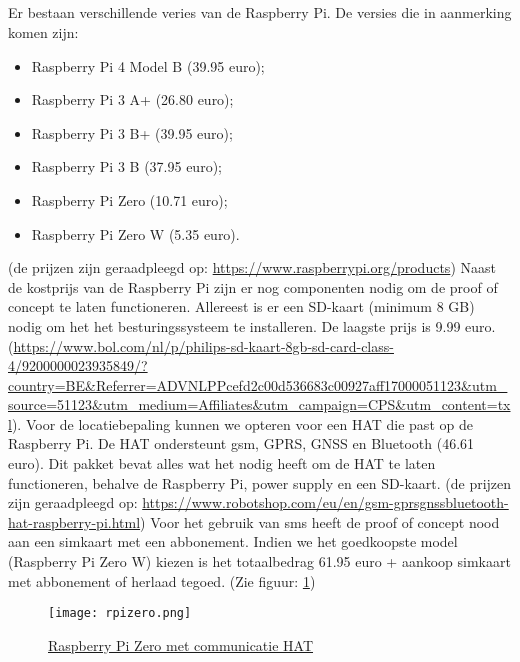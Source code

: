 \subsection{}
Er bestaan verschillende veries van de Raspberry Pi. De versies die in aanmerking komen zijn:
\begin{itemize}
    \item Raspberry Pi 4 Model B (39.95 euro);
    \item Raspberry Pi 3 A+ (26.80 euro);
    \item Raspberry Pi 3 B+ (39.95 euro);
    \item Raspberry Pi 3 B (37.95 euro);
    \item Raspberry Pi Zero (10.71 euro);
    \item Raspberry Pi Zero W (5.35 euro).
\end{itemize}
(de prijzen zijn geraadpleegd op: \url{https://www.raspberrypi.org/products})
\newline
Naast de kostprijs van de Raspberry Pi zijn er nog componenten nodig om de proof of concept te laten functioneren. 
Allereest is er een SD-kaart (minimum 8 GB) nodig om het het besturingssysteem te installeren. De laagste prijs is 9.99 euro. (\url{https://www.bol.com/nl/p/philips-sd-kaart-8gb-sd-card-class-4/9200000023935849/?country=BE&Referrer=ADVNLPPcefd2c00d536683c00927aff17000051123&utm_source=51123&utm_medium=Affiliates&utm_campaign=CPS&utm_content=txl}).
\newline
Voor de locatiebepaling kunnen we opteren voor een HAT die past op de Raspberry Pi. De HAT ondersteunt gsm, GPRS, GNSS en Bluetooth (46.61 euro). Dit pakket bevat alles wat het nodig heeft om de HAT te laten functioneren, behalve de Raspberry Pi, power supply en een SD-kaart. (de prijzen zijn geraadpleegd op: \url{https://www.robotshop.com/eu/en/gsm-gprsgnssbluetooth-hat-raspberry-pi.html})
\newline
Voor het gebruik van sms heeft de proof of concept nood aan een simkaart met een abbonement.
\newline
Indien we het goedkoopste model (Raspberry Pi Zero W) kiezen is het totaalbedrag 61.95 euro + aankoop simkaart met abbonement of herlaad tegoed. (Zie figuur: \ref{fig:rpi})
\begin{figure}
    \texttt{[image: rpizero.png]}
    \caption{\href{https://www.sossolutions.nl/waveshare-gsm-gprs-gnss-bluetooth-hat-voor-raspberry-pi?gclid=Cj0KCQiA1-3yBRCmARIsAN7B4H3Z9w0Z11t4JCm9ggLyzhnV-yiRS6dDgZtefIcETuYflOTaskne-ywaAkLnEALw_wcB}{Raspberry Pi Zero met communicatie HAT}}
    \label{fig:rpi}
\end{figure}
